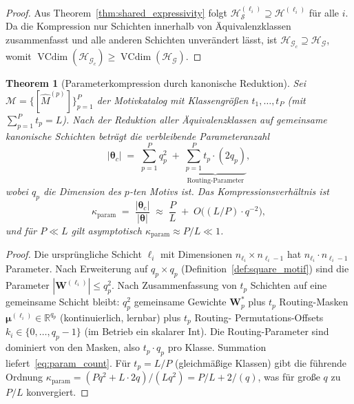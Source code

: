 \documentclass[12pt, a4paper, openany]{report}
\newtheorem{theorem}{Theorem}[chapter]
\newcommand{\R}{\mathbb{R}}
\newcommand{\calG}{\mathcal{G}}
\newcommand{\calH}{\mathcal{H}}
\newcommand{\calM}{\mathcal{M}}
\newcommand{\calS}{\mathcal{S}}
\DeclareMathOperator{\VC}{VCdim}
\begin{document}
\begin{proof}
Aus Theorem~\ref{thm:shared_expressivity} folgt
$\calH_{\calS}^{(\ell_i)} \supseteq \calH^{(\ell_i)}$ für alle $i$.
Da die Kompression nur Schichten innerhalb von Äquivalenzklassen
zusammenfasst und alle anderen Schichten unverändert lässt, ist
$\calH_{\calG_c} \supseteq \calH_{\calG}$, womit
$\VC(\calH_{\calG_c}) \geq \VC(\calH_{\calG})$.
\end{proof}

\begin{theorem}[Parameterkompression durch kanonische Reduktion]
\label{thm:param_compression}
Sei $\calM = \{[\hat{M}^{(p)}]\}_{p=1}^P$ der Motivkatalog mit
Klassengrößen $t_1, \ldots, t_P$ (mit $\sum_{p=1}^P t_p = L$).
Nach der Reduktion aller Äquivalenzklassen auf gemeinsame kanonische
Schichten beträgt die verbleibende Parameteranzahl
\begin{equation}
  \label{eq:param_count}
  |\bm{\theta}_c|
  \;=\;
  \sum_{p=1}^{P} q_p^2
  \;+\;
  \underbrace{\sum_{p=1}^{P} t_p \cdot (2q_p)}_{\text{Routing-Parameter}},
\end{equation}
wobei $q_p$ die Dimension des $p$-ten Motivs ist.  Das
\emph{Kompressionsver\-hältnis} ist
\begin{equation}
  \label{eq:compression_ratio}
  \kappa_{\mathrm{param}}
  \;=\;
  \frac{|\bm{\theta}_c|}{|\bm{\theta}|}
  \;\approx\;
  \frac{P}{L} \;+\; O\!\bigl((L/P) \cdot q^{-2}\bigr),
\end{equation}
und für $P \ll L$ gilt asymptotisch $\kappa_{\mathrm{param}} \approx P/L \ll 1$.
\end{theorem}

\begin{proof}
Die ursprüngliche Schicht $\ell_i$ mit Dimensionen $n_{\ell_i} \times n_{\ell_i - 1}$
hat $n_{\ell_i} \cdot n_{\ell_i-1}$ Parameter.  Nach Erweiterung auf $q_p \times q_p$
(Definition~\ref{def:square_motif}) sind die Parameter $|\bm{W}^{(\ell_i)}| \leq q_p^2$.
Nach Zusammenfassung von $t_p$ Schichten auf eine gemeinsame Schicht bleibt:
$q_p^2$ gemeinsame Gewichte $\bm{W}^*_p$ plus $t_p$ Routing-Masken
$\bm{\mu}^{(\ell_i)} \in \R^{q_p}$ (kontinuierlich, lernbar) plus $t_p$ Routing-
Permutations-Offsets $k_i \in \{0,\ldots,q_p-1\}$ (im Betrieb ein skalarer Int).
Die Routing-Parameter sind dominiert von den Masken, also $t_p \cdot q_p$ pro
Klasse.  Summation liefert~\eqref{eq:param_count}.  Für $t_p = L/P$ (gleichmäßige
Klassen) gibt die führende Ordnung
$\kappa_{\mathrm{param}} = (P q^2 + L \cdot 2q) / (L q^2) = P/L + 2/(q)$,
was für große $q$ zu $P/L$ konvergiert.
\end{proof}
\end{document}
